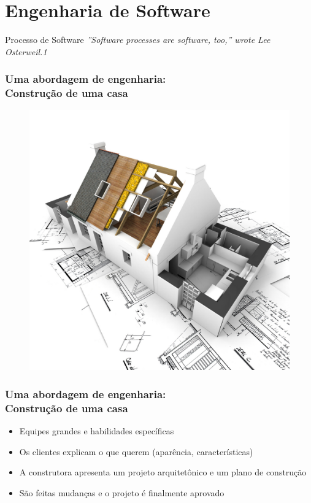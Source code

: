 
\section{Engenharia de Software}

\begin{frame}
\begin{block}{Processo de Software}
 \textit{”Software processes are software, too,” wrote Lee Osterweil.1}
\end{block}
\end{frame}


\begin{frame}
\frametitle{Uma abordagem de engenharia:\\
Construção de uma casa}

\begin{figure}
  \includegraphics[height = \textheight]{figs/construcao-de-moradia.jpg}
 \end{figure}

\end{frame}

\begin{frame}
\frametitle{Uma abordagem de engenharia:\\
Construção de uma casa}
\begin{itemize}
 \item Equipes grandes e habilidades específicas
 \item Os clientes explicam o que querem (aparência, características)
 \item A construtora apresenta um projeto arquitetônico e um plano de construção
\item São feitas mudanças e o projeto é finalmente aprovado
\end{itemize}
\end{frame}


